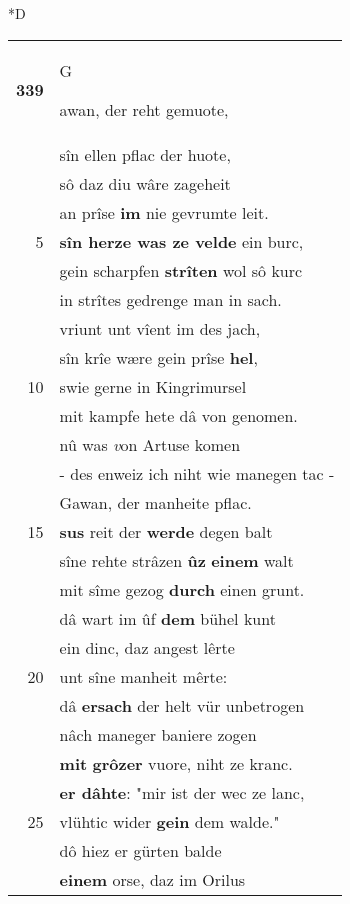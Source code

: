 \documentclass[8pt,a4paper,notitlepage]{article}
\begin{document}
\begin{table}[ht]
\begin{minipage}[t]{0.5\linewidth}
\small
\begin{center}*D
\end{center}
\begin{tabular}{rl}
\textbf{339} & \begin{large}G\end{large}awan, der reht gemuote,\\ 
 & sîn ellen pflac der huote,\\ 
 & sô daz diu wâre zageheit\\ 
 & an prîse \textbf{im} nie gevrumte leit.\\ 
5 & \textbf{sîn herze was ze velde} ein burc,\\ 
 & gein scharpfen \textbf{strîten} wol sô kurc\\ 
 & in strîtes gedrenge man in sach.\\ 
 & vriunt unt vîent im des jach,\\ 
 & sîn krîe wære gein prîse \textbf{hel},\\ 
10 & swie gerne in Kingrimursel\\ 
 & mit kampfe hete dâ von genomen.\\ 
 & nû was \textit{v}on Artuse komen\\ 
 & - des enweiz ich niht wie manegen tac -\\ 
 & Gawan, der manheite pflac.\\ 
15 & \textbf{sus} reit der \textbf{werde} degen balt\\ 
 & sîne rehte strâzen \textbf{ûz} \textbf{einem} walt\\ 
 & mit sîme gezog \textbf{durch} einen grunt.\\ 
 & dâ wart im ûf \textbf{dem} bühel kunt\\ 
 & ein dinc, daz angest lêrte\\ 
20 & unt sîne manheit mêrte:\\ 
 & dâ \textbf{ersach} der helt vür unbetrogen\\ 
 & nâch maneger baniere zogen\\ 
 & \textbf{mit} \textbf{grôzer} vuore, niht ze kranc.\\ 
 & \textbf{er dâhte}: "mir ist der wec ze lanc,\\ 
25 & vlühtic wider \textbf{gein} dem walde."\\ 
 & dô hiez er gürten balde\\ 
 & \textbf{einem} orse, daz im Orilus\\ 

\end{tabular}
\end{minipage}
\end{table}
\end{document}
